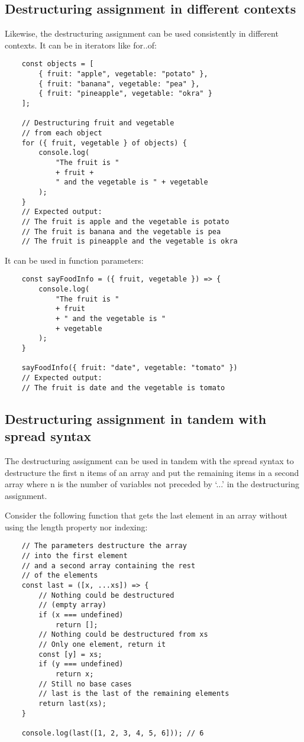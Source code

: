\documentclass[11pt,a4paper]{article}
\begin{document}
\subsection{Destructuring assignment in different contexts}
Likewise, the destructuring assignment can be used consistently in different contexts.
It can be in iterators like for..of:
\begin{verbatim}
    const objects = [
        { fruit: "apple", vegetable: "potato" },
        { fruit: "banana", vegetable: "pea" },
        { fruit: "pineapple", vegetable: "okra" }
    ];

    // Destructuring fruit and vegetable
    // from each object
    for ({ fruit, vegetable } of objects) {
        console.log(
            "The fruit is "
            + fruit +
            " and the vegetable is " + vegetable
        );
    }
    // Expected output:
    // The fruit is apple and the vegetable is potato
    // The fruit is banana and the vegetable is pea
    // The fruit is pineapple and the vegetable is okra
\end{verbatim}
It can be used in function parameters:
\begin{verbatim}
    const sayFoodInfo = ({ fruit, vegetable }) => {
        console.log(
            "The fruit is "
            + fruit
            + " and the vegetable is "
            + vegetable
        );
    }

    sayFoodInfo({ fruit: "date", vegetable: "tomato" })
    // Expected output:
    // The fruit is date and the vegetable is tomato
\end{verbatim}

\subsection{Destructuring assignment in tandem with spread syntax}
The destructuring assignment can be used in tandem with the spread syntax to
destructure the first n items of an array and put the remaining items in a second array
where n is the number of variables not preceded by `...' in the destructuring assignment.

Consider the following function that gets the last element in an array without using the length property nor indexing:
\begin{verbatim}
    // The parameters destructure the array
    // into the first element
    // and a second array containing the rest
    // of the elements
    const last = ([x, ...xs]) => {
        // Nothing could be destructured
        // (empty array)
        if (x === undefined)
            return [];
        // Nothing could be destructured from xs
        // Only one element, return it
        const [y] = xs;
        if (y === undefined)
            return x;
        // Still no base cases
        // last is the last of the remaining elements
        return last(xs);
    }

    console.log(last([1, 2, 3, 4, 5, 6])); // 6
\end{verbatim}
\end{document}
